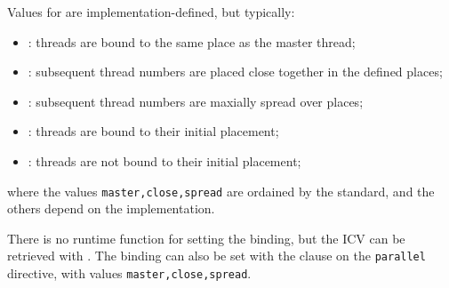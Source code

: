 Values for  are implementation-defined,
but typically:
\begin{itemize}
\item {}: threads are bound to the same place as the master thread;
\item {}: subsequent thread numbers are placed close together
  in the defined places;
\item {}: subsequent thread numbers are maxially spread over places;
\item {}: threads are bound to their initial placement;
\item {}: threads are not bound to their initial placement;
\end{itemize}
where the values \lstinline[language=omp]{master,close,spread} are ordained by the standard,
and the others depend on the implementation.

There is no runtime function for setting the binding, but the \ac{ICV} 
can be retrieved with .
The binding can also be set with the  clause
on the \lstinline[language=omp]{parallel} directive,
with values \lstinline[language=omp]{master,close,spread}.

